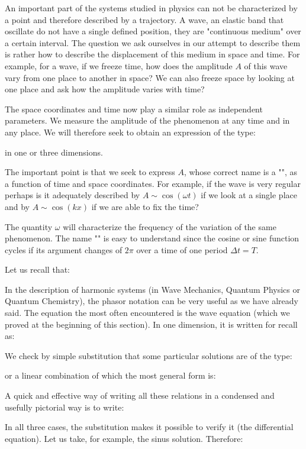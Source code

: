 	An important part of the systems studied in physics can not be characterized by a point and therefore described by a trajectory. A wave, an elastic band that oscillate do not have a single defined position, they are "continuous medium" over a certain interval. The question we ask ourselves in our attempt to describe them is rather how to describe the displacement of this medium in space and time. For example, for a wave, if we freeze time, how does the amplitude $A$ of this wave vary from one place to another in space? We can also freeze space by looking at one place and ask how the amplitude varies with time?
	
	The space coordinates and time now play a similar role as independent parameters. We measure the amplitude of the phenomenon at any time and in any place. We will therefore seek to obtain an expression of the type:
	
	in one or three dimensions.
	
	The important point is that we seek to express $A$, whose correct name is a "", as a function of time and space coordinates. For example, if the wave is very regular perhaps is it adequately described by $A\sim \cos(\omega t)$ if we look at a single place and by $A\sim\cos(kx)$ if we are able to fix the time?
	
	The quantity $\omega$ will characterize the frequency of the variation of the same phenomenon. The name "" is easy to understand since the cosine or sine function cycles if its argument changes of $2\pi$ over a time of one period $\Delta t=T$.

	Let us recall that:
	
	In the description of harmonic systems (in Wave Mechanics, Quantum Physics or Quantum Chemistry), the phasor notation can be very useful as we have already said. The equation the most often encountered is the wave equation (which we proved at the beginning of this section). In one dimension, it is written for recall as:
	
	We check by simple substitution that some particular solutions are of the type:
	
	or a linear combination of which the most general form is:
	
	A quick and effective way of writing all these relations in a condensed and usefully pictorial way is to write:
	
	In all three cases, the substitution makes it possible to verify it (the differential equation). Let us take, for example, the sinus solution. Therefore:
	
